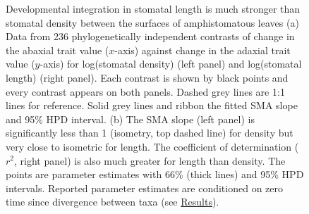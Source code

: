 \documentclass[
  12pt,
]{article}
\begin{document}
\begin{figure}[ht]
\caption{Developmental integration in stomatal length is much stronger than stomatal density between the surfaces of amphistomatous leaves (a) Data from 236 phylogenetically independent contrasts of change in the abaxial trait value ($x$-axis) against change in the adaxial trait value ($y$-axis) for log(stomatal density) (left panel) and log(stomatal length) (right panel). Each contrast is shown by black points and every contrast appears on both panels. Dashed grey lines are 1:1 lines for reference. Solid grey lines and ribbon the fitted SMA slope and 95\% HPD interval. (b) The SMA slope (left panel) is significantly less than 1 (isometry, top dashed line) for density but very close to isometric for length. The coefficient of determination ($r^2$, right panel) is also much greater for length than density. The points are parameter estimates with 66\% (thick lines) and 95\% HPD intervals. Reported parameter estimates are conditioned on zero time since divergence between taxa (see \protect\hyperlink{results}{Results}).}
\label{fig:h2}
\end{figure}

\clearpage

\renewcommand\thefigure{S\arabic{figure}}    
\renewcommand\thetable{S\arabic{table}}    
\renewcommand\theequation{S\arabic{equation}}    
\setcounter{figure}{0}    
\setcounter{table}{0}    
\setcounter{equation}{0}

\begin{figure}[ht]
  \captionsetup{labelformat=empty}
  \caption{}
  \label{fig:fs-sigma}
\end{figure}

\begin{figure}[ht]
  \captionsetup{labelformat=empty}
  \caption{}
  \label{fig:genome}
\end{figure}

\begin{figure}[ht]
  \captionsetup{labelformat=empty}
  \caption{}
  \label{fig:developmental-integration}
\end{figure}

\begin{figure}[ht]
  \captionsetup{labelformat=empty}
  \caption{}
  \label{fig:check-approximation}
\end{figure}

\begin{table}
  \captionsetup{labelformat=empty}
  \caption{}
  \label{tab:pair_div}
\end{table}
\end{document}
